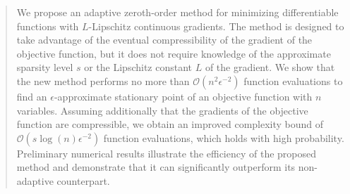 
\author{Geovani N. Grapiglia \and Daniel McKenzie}


\date{Received: date / Accepted: date}

\maketitle

\begin{abstract} We propose an adaptive zeroth-order method for minimizing differentiable functions with $L$-Lipschitz continuous gradients. The method is designed to take advantage of the eventual compressibility of the gradient of the objective function, but it does not require knowledge of the approximate sparsity level $s$ or the Lipschitz constant $L$ of the gradient. We show that the new method performs no more than $\mathcal{O}\left(n^{2}\epsilon^{-2}\right)$ function evaluations to find an $\epsilon$-approximate stationary point of an objective function with $n$ variables. Assuming additionally that the gradients of the objective function are compressible, we obtain an improved complexity bound of $\mathcal{O}\left(s\log\left(n\right)\epsilon^{-2}\right)$ function evaluations, which holds with high probability. Preliminary numerical results illustrate the efficiency of the proposed method and demonstrate that it can significantly outperform its non-adaptive counterpart.


\end{abstract}



